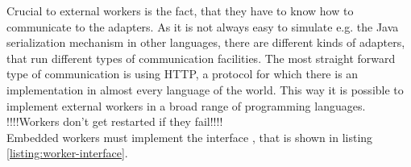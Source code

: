   Crucial to external workers is the fact, that they have to know how to communicate to the adapters. As it is not always easy to simulate e.g. the Java serialization mechanism in other languages, there are different kinds of adapters, that run different types of communication facilities. The most straight forward type of communication is using HTTP, a protocol for which there is an implementation in almost every language of the world. This way it is possible to implement external workers in a broad range of programming languages.\\
  
  
  !!!!Workers don't get restarted if they fail!!!!\\
  
  
  Embedded workers must implement the interface , that is shown in listing \ref{listing:worker-interface}.

  
  
